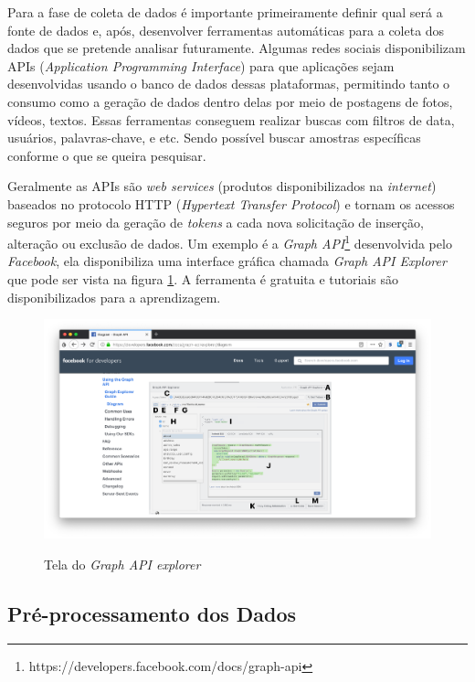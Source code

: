 Para a fase de coleta de dados é importante primeiramente definir qual será a fonte de dados e, após, desenvolver ferramentas automáticas para a coleta dos dados que se pretende analisar futuramente. Algumas redes sociais disponibilizam APIs (\textit{Application Programming Interface}) para que aplicações sejam desenvolvidas usando o banco de dados dessas plataformas, permitindo tanto o consumo como a geração de dados dentro delas por meio de postagens de fotos, vídeos, textos. Essas ferramentas conseguem realizar buscas com filtros de data, usuários, palavras-chave, e etc. Sendo possível buscar amostras específicas conforme o que se queira pesquisar.

Geralmente as APIs são \textit{web services} (produtos disponibilizados na \textit{internet}) baseados no protocolo HTTP (\textit{Hypertext Transfer Protocol}) e tornam os acessos seguros por meio da geração de \textit{tokens} a cada nova solicitação de inserção, alteração ou exclusão de dados. Um exemplo é a \textit{Graph API}\footnote{https://developers.facebook.com/docs/graph-api} desenvolvida pelo \textit{Facebook}, ela disponibiliza uma interface gráfica chamada \textit{Graph API Explorer} que pode ser vista na figura \ref{fig:GraphAPIExplorer}. A ferramenta é gratuita e tutoriais são disponibilizados para a aprendizagem.

\begin{figure}[!h]
\centering 
\caption{Tela do \textit{Graph API explorer}}
\includegraphics[scale=0.35]{imagens/graphapiexplorer.png}
\label{fig:GraphAPIExplorer}
\end{figure}

\subsection{Pré-processamento dos Dados}
\label{subsec:preproc}

